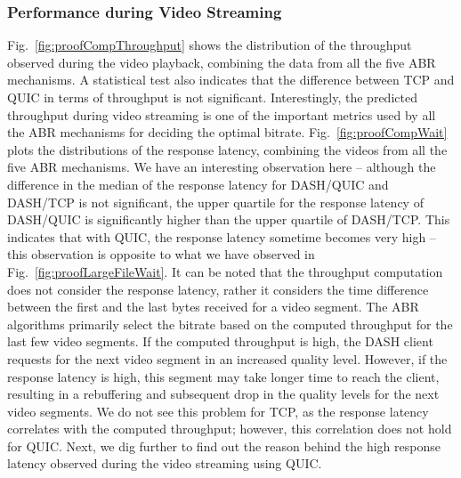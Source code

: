 \subsubsection{Performance during Video Streaming}
Fig.~\ref{fig:proofCompThroughput} shows the distribution of the throughput observed during the video playback, combining the data from all the five ABR mechanisms. A statistical test also indicates that the difference between TCP and QUIC in terms of throughput is not significant. Interestingly, the predicted throughput during video streaming is one of the important metrics used by all the ABR mechanisms for deciding the optimal bitrate. Fig.~\ref{fig:proofCompWait} plots the distributions of the response latency, combining the videos from all the five ABR mechanisms. We have an interesting observation here -- although the difference in the median of the response latency for DASH/QUIC and DASH/TCP is not significant,  the upper quartile for the response latency of DASH/QUIC is significantly higher than the upper quartile of DASH/TCP. This indicates that with QUIC, the response latency sometime becomes very high -- this observation is opposite to what we have observed in Fig.~\ref{fig:proofLargeFileWait}. It can be noted that the throughput computation does not consider the response latency, rather it considers the time difference between the first and the last bytes received for a video segment. The ABR algorithms primarily select the bitrate based on the computed throughput for the last few video segments. If the computed throughput is high, the DASH client requests for the next video segment in an increased quality level. However, if the response latency is high, this segment may take longer time to reach the client, resulting in a rebuffering and subsequent drop in the quality levels for the next video segments. We do not see this problem for TCP, as the response latency correlates with the computed throughput; however, this correlation does not hold for QUIC. Next, we dig further to find out the reason behind the high response latency observed during the video streaming using QUIC.

